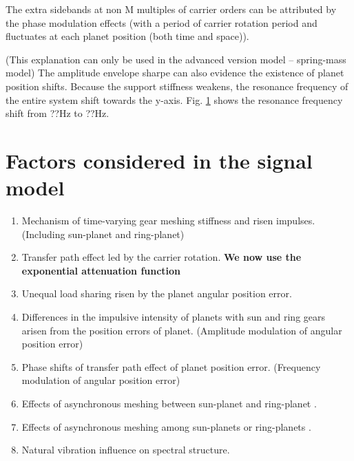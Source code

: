 \documentclass[a4paper,fleqn]{cas-sc}%
\begin{document}
\par The extra sidebands at non M multiples of carrier orders can be attributed by the phase modulation effects (with a period of carrier rotation period and fluctuates at each planet position (both time and space)).
\par (This explanation can only be used in the advanced version model -- spring-mass model) The amplitude envelope sharpe can also evidence the existence of planet position shifts. Because the support stiffness weakens, the resonance frequency of the entire system shift towards the y-axis. Fig. \ref{} shows the resonance frequency shift from ??Hz to ??Hz.

\section{Factors considered in the signal model}
\begin{enumerate}
    \item Mechanism of time-varying gear meshing stiffness and risen impulses. (Including sun-planet and ring-planet)
    \item Transfer path effect led by the carrier rotation. \textbf{We now use the exponential attenuation function}
    \item Unequal load sharing risen by the planet angular position error.
    \item Differences in the impulsive intensity of planets with sun and ring gears arisen from the position errors of planet. (Amplitude modulation of angular position error)
    \item Phase shifts of transfer path effect of planet position error. (Frequency modulation of angular position error)
    \item Effects of asynchronous meshing between sun-planet and ring-planet \cite{Parker2004}.
    \item Effects of asynchronous meshing among sun-planets or ring-planets \cite{Inalpolat2009}.
    \item Natural vibration influence on spectral structure.
\end{enumerate}
\end{document}
